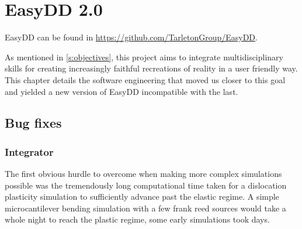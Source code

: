 \chapter{EasyDD 2.0}
\label{c:easydd}

EasyDD can be found in \href{https://github.com/TarletonGroup/EasyDD}{https://github.com/TarletonGroup/EasyDD}.

As mentioned in \cref{s:objectives}, this project aims to integrate multidisciplinary skills for creating increasingly faithful recreations of reality in a user friendly way. This chapter details the software engineering that moved us closer to this goal and yielded a new version of EasyDD incompatible with the last.

\section{Bug fixes}
\label{s:bugs}

\subsection{Integrator}
\label{ss:integrator}

The first obvious hurdle to overcome when making more complex simulations possible was the tremendously long computational time taken for a dislocation plasticity simulation to sufficiently advance past the elastic regime. A simple microcantilever bending simulation with a few frank reed sources would take a whole night to reach the plastic regime, some early simulations took days.

